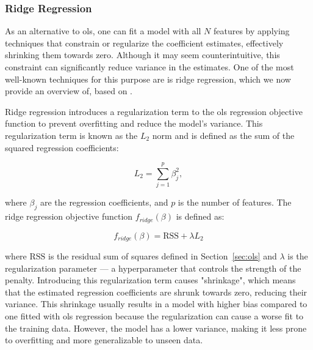 \subsubsection{Ridge Regression}
As an alternative to \gls{ols}, one can fit a model with all $N$ features by applying techniques that constrain or regularize the coefficient estimates, effectively shrinking them towards zero.
Although it may seem counterintuitive, this constraint can significantly reduce variance in the estimates.
One of the most well-known techniques for this purpose are is ridge regression, which we now provide an overview of, based on \citet{James2023AnIS}.

Ridge regression introduces a regularization term to the \gls{ols} regression objective function to prevent overfitting and reduce the model's variance.
This regularization term is known as the $L_2$ norm and is defined as the sum of the squared regression coefficients:

$$
L_2 = \sum_{j=1}^{p} \beta_j^2,
$$

where $\beta_j$ are the regression coefficients, and $p$ is the number of features.
The ridge regression objective function $f_{ridge}(\beta)$ is defined as:

$$
f_{ridge}(\beta) = \text{RSS} + \lambda L_2
$$

where $\text{RSS}$ is the residual sum of squares defined in Section~\ref{sec:ols} and $\lambda$ is the regularization parameter --- a hyperparameter that controls the strength of the penalty.
Introducing this regularization term causes "shrinkage", which means that the estimated regression coefficients are shrunk towards zero, reducing their variance.
This shrinkage usually results in a model with higher bias compared to one fitted with \gls{ols} regression because the regularization can cause a worse fit to the training data.
However, the model has a lower variance, making it less prone to overfitting and more generalizable to unseen data.